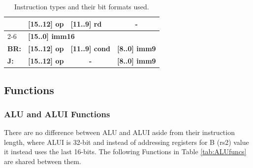 \documentclass{article}
\begin{document}
\begin{table}[!h]
\begin{tabular}{|l|lllll}
\rowcolor[HTML]{BAFEFF} 
\cellcolor[HTML]{BAFEFF}                               & \multicolumn{1}{l|}{\cellcolor[HTML]{BAFEFF}\textbf{{[}15..12{]} op}} & \multicolumn{1}{l|}{\cellcolor[HTML]{BAFEFF}\textbf{{[}11..9{]} rd}}   & \multicolumn{3}{c}{\cellcolor[HTML]{BAFEFF}\textbf{-}}                                                                                                                                                              \\ \cline{2-6} 
\rowcolor[HTML]{BAFEFF} 
\multirow{-2}{*}{\cellcolor[HTML]{BAFEFF}\textbf{LI:}} & \multicolumn{5}{l}{\cellcolor[HTML]{BAFEFF}\textbf{{[}15..0{]} imm16}}                                                                                                                                                                                                                                                                                               \\ \hline
\rowcolor[HTML]{D6DCE4} 
\textbf{BR:}                                           & \multicolumn{1}{l|}{\cellcolor[HTML]{D6DCE4}\textbf{{[}15..12{]} op}} & \multicolumn{1}{l|}{\cellcolor[HTML]{D6DCE4}\textbf{{[}11..9{]} cond}} & \multicolumn{3}{l}{\cellcolor[HTML]{D6DCE4}\textbf{{[}8..0{]} imm9}}                                                                                                                                                \\ \hline
\rowcolor[HTML]{F7DCDC} 
\textbf{J:}                                            & \multicolumn{1}{l|}{\cellcolor[HTML]{F7DCDC}\textbf{{[}15..12{]} op}} & \multicolumn{1}{c|}{\cellcolor[HTML]{F7DCDC}\textbf{-}}                & \multicolumn{3}{l}{\cellcolor[HTML]{F7DCDC}\textbf{{[}8..0{]} imm9}}                                                                                                                                                \\ \hline
\end{tabular}
\caption{Instruction types and their bit formats used.}
\label{instrt}
\end{table}


\subsection{Functions}

\subsubsection{ALU and ALUI Functions}
There are no difference between ALU and ALUI aside from their instruction length, where ALUI is 32-bit and instead of addressing registers for B (rs2) value it instead uses the last 16-bits. The following Functions in Table \ref{tab:ALUfuncs} are shared between them.
\end{document}
